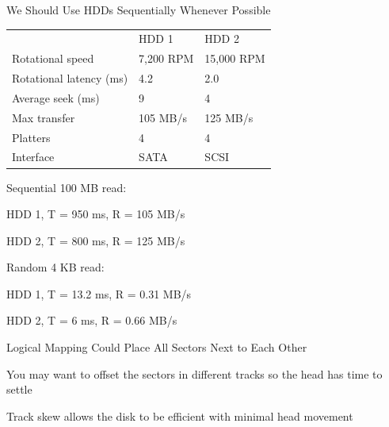   \begin{frame}{We Should Use HDDs Sequentially Whenever Possible}
    \begin{tabular}{lll}
                       & HDD 1     & HDD 2      \\
      Rotational speed & 7,200 RPM & 15,000 RPM \\
      Rotational latency (ms) & 4.2 & 2.0 \\
      Average seek (ms) & 9 & 4 \\
      Max transfer & 105 MB/s & 125 MB/s \\
      Platters & 4 & 4 \\
      Interface & SATA & SCSI \\
    \end{tabular}

    \vspace{2em}

    Sequential 100 MB read:

    \hspace{2em} HDD 1, T = 950 ms, R = 105 MB/s

    \hspace{2em} HDD 2, T = 800 ms, R = 125 MB/s

    Random 4 KB read:

    \hspace{2em} HDD 1, T = 13.2 ms, R = 0.31 MB/s

    \hspace{2em} HDD 2, T = 6 ms, R = 0.66 MB/s
  \end{frame}

  \begin{frame}{Logical Mapping Could Place All Sectors Next to Each Other}

    \begin{center}
    \end{center}

    You may want to offset the sectors in different tracks so the head has
    time to settle

    \hspace{2em} Track skew allows the disk to be efficient with minimal head
    movement
  \end{frame}

